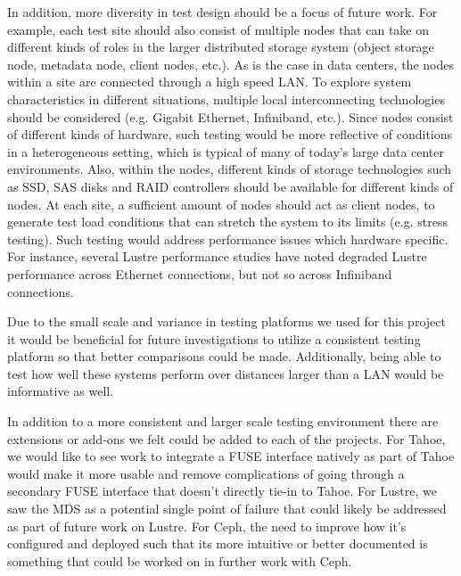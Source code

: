 \documentclass[11pt]{article}
\begin{document}
In addition, more diversity in test design should be a focus of future 
work. For example, each test site should also consist of multiple nodes 
that can take on different kinds of roles in the larger distributed 
storage system (object storage node, metadata node, client nodes, etc.). 
As is the case in data centers, the nodes within a site are connected 
through a high speed LAN. To explore system characteristics in different 
situations, multiple local interconnecting technologies should be 
considered (e.g. Gigabit Ethernet, Infiniband, etc.). Since nodes 
consist of different kinds of hardware, such testing would be more 
reflective of conditions in a heterogeneous setting, which is typical 
of many of today’s large data center environments. Also, within the 
nodes, different kinds of storage technologies such as SSD, SAS disks 
and RAID controllers should be available for different kinds of nodes. 
At each site, a sufficient amount of nodes should act as client nodes, 
to generate test load conditions that can stretch the system to its 
limits (e.g. stress testing). Such testing would address performance 
issues which hardware specific. For instance, several Lustre performance 
studies have noted degraded Lustre performance across Ethernet connections,
but not so across Infiniband connections.

Due to the small scale and variance in testing platforms we used for this project it would be beneficial for future investigations to utilize a consistent testing platform so that better comparisons could be made. Additionally, being able to test how well these systems perform over distances larger than a LAN would be informative as well. 

In addition to a more consistent and larger scale testing environment there are extensions or add-ons we felt could be added to each of the projects. For Tahoe, we would like to see work to integrate a FUSE interface natively as part of Tahoe would make it more usable and remove complications of going through a secondary FUSE interface that doesn't directly tie-in to Tahoe. For Lustre, we saw the MDS as a potential single point of failure that could likely be addressed as part of future work on Lustre. For Ceph, the need to improve how it's configured and deployed such that its more intuitive or better documented is something that could be worked on in further work with Ceph. 

\nocite{*}


\appendix

\pagebreak
\end{document}

